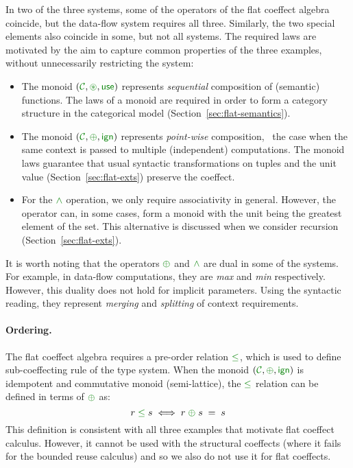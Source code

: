 \noindent
In two of the three systems, some of the operators of the flat coeffect algebra coincide,
but the data-flow system requires all three. Similarly, the two special elements also 
coincide in some, but not all systems. The required laws are motivated by the aim to capture
common properties of the three examples, without unnecessarily restricting the system:

\begin{itemize}
\item The monoid $(\C, \cseq, \cunit)$ represents \emph{sequential} composition of (semantic)
functions. The laws of a monoid are required in order to form a category structure in the 
categorical model (Section~\ref{sec:flat-semantics}).

\item The monoid $(\C, \cpar, \czero)$ represents \emph{point-wise} composition, \ie~the case when the
same context is passed to multiple (independent) computations. The monoid laws guarantee 
that usual syntactic transformations on tuples and the unit value (Section~\ref{sec:flat-exts})
preserve the coeffect. 

\item For the $\czip$ operation, we only require associativity in general. However, the operator can,
in some cases, form a monoid with the unit being the greatest element of the set. This 
alternative is discussed when we consider recursion (Section~\ref{sec:flat-exts}).
\end{itemize}

It is worth noting that the operators $\cpar$ and $\czip$ are dual in some of the systems. For 
example, in data-flow computations, they are \emph{max} and \emph{min} respectively. However, this
duality does not hold for implicit parameters. Using the syntactic reading, they represent 
\emph{merging} and \emph{splitting} of context requirements. 

\paragraph{Ordering.}

The flat coeffect algebra requires a pre-order relation $\cleq$, which is used to define 
sub-coeffecting rule of the type system. When the monoid $(\C, \cpar, \czero)$ is idempotent
and commutative monoid (semi-lattice), the $\cleq$ relation can be defined in terms of $\cpar$ as:
%
\begin{equation*}
r \;\cleq\; s \;\Longleftrightarrow\; r \;\cpar\; s \;=\; s
\end{equation*}
%
This definition is consistent with all three examples that motivate flat coeffect calculus.
However, it cannot be used with the structural coeffects (where it fails for the bounded reuse 
calculus) and so we also do not use it for flat coeffects.

